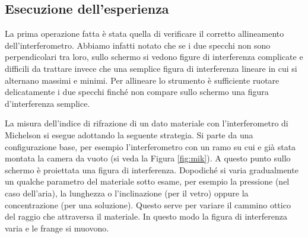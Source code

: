 \subsection{Esecuzione dell'esperienza}

La prima operazione fatta è stata quella di verificare il corretto allineamento dell'interferometro. Abbiamo infatti notato che se i due specchi non sono perpendicolari tra loro, sullo schermo si vedono figure di interferenza complicate e difficili da trattare invece che una semplice figura di interferenza lineare in cui si alternano massimi e minimi. Per allineare lo strumento è sufficiente ruotare delicatamente i due specchi finché non compare sullo schermo una figura d'interferenza semplice.


La misura dell'indice di rifrazione di un dato materiale con l'interferometro di Michelson si esegue adottando la seguente strategia.
Si parte da una configurazione base, per esempio l'interferometro con un ramo su cui e già stata montata la camera da vuoto
(si veda la Figura \ref{fig:mik}). A questo punto sullo schermo è proiettata una figura di interferenza. Dopodiché si
varia gradualmente un qualche parametro del materiale sotto esame, per esempio la pressione (nel caso dell'aria), la lunghezza o l'inclinazione (per il vetro) oppure la concentrazione (per una soluzione). %
Questo serve per variare il cammino ottico del raggio che attraversa il materiale.
In questo modo la figura di interferenza varia e le frange si muovono.


%

